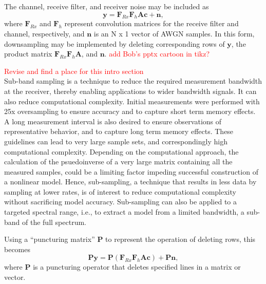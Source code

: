 The channel,  receive filter, and receiver noise may be included as
\begin{equation}\label{eqyFrxh}
\boldsymbol{y} = \boldsymbol{F}_{Rx}\boldsymbol{F}_h\boldsymbol{Ac} + \boldsymbol{n},
\end{equation}
where $\boldsymbol{F}_{Rx}$ and $\boldsymbol{F}_h$ represent convolution matrices for the receive filter and channel, respectively, and $\boldsymbol{n}$ is an N x 1 vector of AWGN samples.  In this form, downsampling may be implemented by deleting corresponding rows of $\boldsymbol{y}$, the product matrix $\boldsymbol{F}_{Rx}\boldsymbol{F}_h\boldsymbol{A}$, and $\boldsymbol{n}$.  \textcolor{red}{ add Bob's pptx cartoon in tikz?}

\textcolor{red}{Revise and find a place for this intro section}\\Sub-band sampling is a technique to reduce the required measurement bandwidth at the receiver, thereby enabling applications to wider bandwidth signals.  It can also reduce computational complexity.   Initial measurements were performed with 25x oversampling to ensure accuracy and to capture short term memory effects.  A long measurement interval is also desired to ensure observations of representative behavior, and to capture long term memory effects.  These guidelines can lead to very large sample sets, and correspondingly high computational complexity.  Depending on the computational approach, the calculation of the psuedoinverse of a very large matrix containing all the measured samples, could be a limiting factor impeding successful construction of a nonlinear model.  Hence, sub-sampling, a technique that results in less data by sampling at lower rates, is of interest to reduce computational complexity without sacrificing model accuracy.  Sub-sampling can also be applied to a targeted spectral range, i.e., to extract a model from a limited bandwidth, a sub-band of the full spectrum.
  
Using a ``puncturing matrix'' $\boldsymbol{P}$ to represent the operation of deleting rows, this becomes										\begin{equation}\label{eqPy}
\boldsymbol{Py} = \boldsymbol{P}(\boldsymbol{F}_{Rx}\boldsymbol{F}_h\boldsymbol{Ac}) + \boldsymbol{Pn},
\end{equation}
where $\boldsymbol{P}$ is a puncturing operator that deletes specified lines in a matrix or vector.


